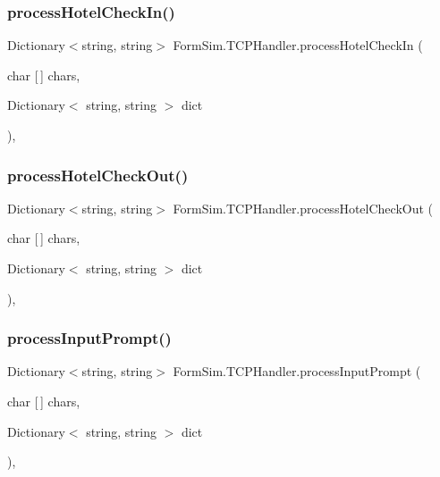 \subsubsection{\texorpdfstring{process\+Hotel\+Check\+In()}{processHotelCheckIn()}}
{\footnotesize\ttfamily Dictionary$<$string, string$>$ Form\+Sim.\+T\+C\+P\+Handler.\+process\+Hotel\+Check\+In (\begin{DoxyParamCaption}\item[{char \mbox{[}$\,$\mbox{]}}]{chars,  }\item[{Dictionary$<$ string, string $>$}]{dict }\end{DoxyParamCaption})\hspace{0.3cm}{\ttfamily [inline]}, {\ttfamily [private]}}

\mbox{\label{class_form_sim_1_1_t_c_p_handler_a17c1a29be83e58752274a3ecb4d0c42d}} 
\subsubsection{\texorpdfstring{process\+Hotel\+Check\+Out()}{processHotelCheckOut()}}
{\footnotesize\ttfamily Dictionary$<$string, string$>$ Form\+Sim.\+T\+C\+P\+Handler.\+process\+Hotel\+Check\+Out (\begin{DoxyParamCaption}\item[{char \mbox{[}$\,$\mbox{]}}]{chars,  }\item[{Dictionary$<$ string, string $>$}]{dict }\end{DoxyParamCaption})\hspace{0.3cm}{\ttfamily [inline]}, {\ttfamily [private]}}

\mbox{\label{class_form_sim_1_1_t_c_p_handler_af9f544ae7073b4365be05307e9eae86a}} 
\subsubsection{\texorpdfstring{process\+Input\+Prompt()}{processInputPrompt()}}
{\footnotesize\ttfamily Dictionary$<$string, string$>$ Form\+Sim.\+T\+C\+P\+Handler.\+process\+Input\+Prompt (\begin{DoxyParamCaption}\item[{char \mbox{[}$\,$\mbox{]}}]{chars,  }\item[{Dictionary$<$ string, string $>$}]{dict }\end{DoxyParamCaption})\hspace{0.3cm}{\ttfamily [inline]}, {\ttfamily [private]}}

